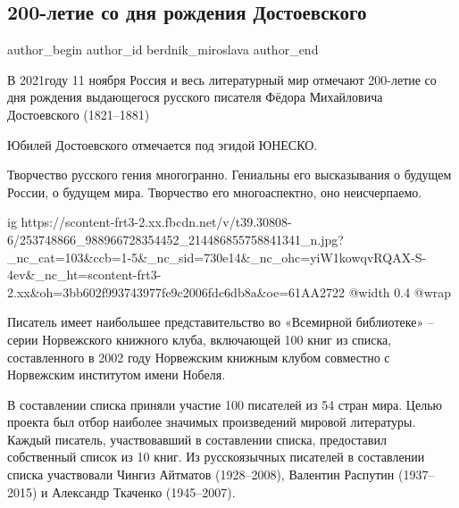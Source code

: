  
 
 
 
 
 
\subsection{200-летие со дня рождения Достоевского}
\label{sec:09_11_2021.fb.berdnik_miroslava.1.dostojevskij_200_let}
 
\ifcmt
 author_begin
   author_id berdnik_miroslava
 author_end
\fi

В 2021году 11 ноября Россия и весь литературный мир отмечают 200-летие со дня
рождения выдающегося русского писателя Фёдора Михайловича Достоевского
(1821–1881)

Юбилей Достоевского отмечается под эгидой ЮНЕСКО.

Творчество русского гения многогранно. Гениальны его высказывания о будущем
России, о будущем мира. Творчество его многоаспектно, оно неисчерпаемо.

\ifcmt
  ig https://scontent-frt3-2.xx.fbcdn.net/v/t39.30808-6/253748866_988966728354452_214486855758841341_n.jpg?_nc_cat=103&ccb=1-5&_nc_sid=730e14&_nc_ohc=yiW1kowqvRQAX-S-4ev&_nc_ht=scontent-frt3-2.xx&oh=3bb602f993743977fe9c2006fdc6db8a&oe=61AA2722
  @width 0.4
  @wrap 
\fi

Писатель имеет наибольшее представительство во «Всемирной библиотеке» – серии
Норвежского книжного клуба, включающей 100 книг из списка, составленного в 2002
году Норвежским книжным клубом совместно с Норвежским институтом имени Нобеля.

В составлении списка приняли участие 100 писателей из 54 стран мира. Целью
проекта был отбор наиболее значимых произведений мировой литературы. Каждый
писатель, участвовавший в составлении списка, предоставил собственный список из
10 книг. Из русскоязычных писателей в составлении списка участвовали Чингиз
Айтматов (1928–2008), Валентин Распутин (1937–2015) и Александр Ткаченко
(1945–2007).

